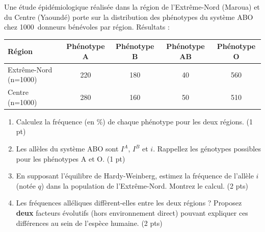 \documentclass[11pt]{article}
\begin{document}
\begin{exercice}
Une étude épidémiologique réalisée dans la région de l'Extrême-Nord (Maroua) et du Centre (Yaoundé) porte sur la distribution des phénotypes du système ABO chez \SI{1000}{donneurs} bénévoles par région. Résultats :

\begin{center}
\begin{tabular}{|l|c|c|c|c|}
\hline
\textbf{Région} & \textbf{Phénotype A} & \textbf{Phénotype B} & \textbf{Phénotype AB} & \textbf{Phénotype O} \\
\hline
Extrême-Nord (n=1000) & 220 & 180 & 40 & 560 \\
\hline
Centre (n=1000) & 280 & 160 & 50 & 510 \\
\hline
\end{tabular}
\end{center}

\begin{enumerate}
    \item Calculez la fréquence (en \%) de chaque phénotype pour les deux régions. (1 pt)
    \item Les allèles du système ABO sont $I^A$, $I^B$ et $i$. Rappellez les génotypes possibles pour les phénotypes A et O. (1 pt)
    \item En supposant l'équilibre de Hardy-Weinberg, estimez la fréquence de l'allèle $i$ (notée $q$) dans la population de l'Extrême-Nord. Montrez le calcul. (2 pts)
    \item Les fréquences alléliques diffèrent-elles entre les deux régions ? Proposez \textbf{deux} facteurs évolutifs (hors environnement direct) pouvant expliquer ces différences au sein de l'espèce humaine. (2 pts)
\end{enumerate}
\end{exercice}
\end{document}
